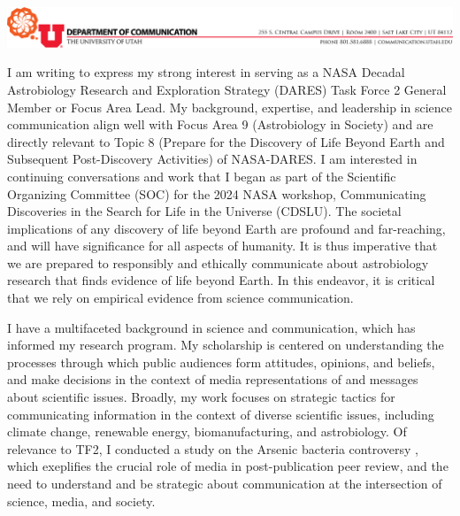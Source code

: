 \documentclass[12pt]{letter}
\begin{document}
\begin{minipage}{4in}
    \vspace{-4em}
    \begin{centering}
        \includegraphics[width=6.5in]{Communication-letterhead.png}
    \end{centering}
    \vspace{0.5em}
\end{minipage}

\vspace{-1.5em}%


I am writing to express my strong interest in serving as a NASA Decadal Astrobiology Research and Exploration Strategy (DARES) Task Force 2 General Member or Focus Area Lead. My background, expertise, and leadership in science communication align well with Focus Area 9 (Astrobiology in Society) and are directly relevant to Topic 8 (Prepare for the Discovery of Life Beyond Earth and Subsequent Post-Discovery Activities) of NASA-DARES. I am interested in continuing conversations and work that I began as part of the Scientific Organizing Committee (SOC) for the 2024 NASA workshop, Communicating Discoveries in the Search for Life in the Universe (CDSLU). The societal implications of any discovery of life beyond Earth are profound and far-reaching, and will have significance for all aspects of humanity. It is thus imperative that we are prepared to responsibly and ethically communicate about astrobiology research that finds evidence of life beyond Earth. In this endeavor, it is critical that we rely on empirical evidence from science communication.

I have a multifaceted background in science and communication, which has informed my research program. My scholarship is centered on understanding the processes through which public audiences form attitudes, opinions, and beliefs, and make decisions in the context of media representations of and messages about scientific issues. Broadly, my work focuses on strategic tactics for communicating information in the context of diverse scientific issues, including climate change, renewable energy, biomanufacturing, and astrobiology. Of relevance to TF2, I conducted a study on the Arsenic bacteria controversy \parencite{yeoCaseArseniclifeBlogs2017}, which exeplifies the crucial role of media in post-publication peer review, and the need to understand and be strategic about communication at the intersection of science, media, and society.
\end{document}

